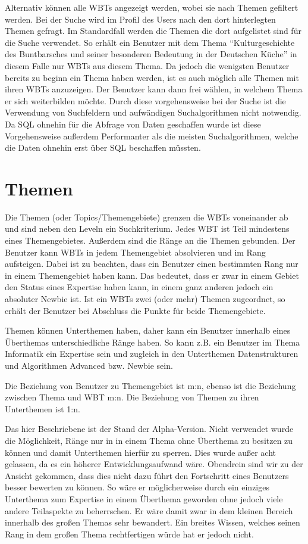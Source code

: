 Alternativ können alle WBTs angezeigt werden, wobei sie nach Themen gefiltert
werden. Bei der Suche wird im Profil des Users nach den dort hinterlegten Themen
gefragt. Im Standardfall werden die Themen die dort aufgelistet sind für die
Suche verwendet. So erhält ein Benutzer mit dem Thema "`Kulturgeschichte des
Buntbarsches und seiner besonderen Bedeutung in der Deutschen Küche"' in
diesem Falle nur WBTs aus diesem Thema. Da jedoch die wenigsten Benutzer bereits
zu beginn ein Thema haben werden, ist es auch möglich alle Themen mit ihren WBTs
anzuzeigen. Der Benutzer kann dann frei wählen, in welchem Thema er sich
weiterbilden möchte. Durch diese vorgehensweise bei der Suche ist die Verwendung
von Suchfeldern und aufwändigen Suchalgorithmen nicht notwendig. Da SQL ohnehin
für die Abfrage von Daten geschaffen wurde ist diese Vorgehensweise außerdem
Performanter als die meisten Suchalgorithmen, welche die Daten ohnehin erst über
SQL beschaffen müssten.

\section{Themen}
Die Themen (oder Topics/Themengebiete) grenzen die WBTs voneinander ab und sind
neben den Leveln ein Suchkriterium. Jedes WBT ist Teil mindestens eines
Themengebietes. Außerdem sind die Ränge an die Themen gebunden. Der Benutzer
kann WBTs in jedem Themengebiet absolvieren und im Rang aufsteigen. Dabei ist zu
beachten, dass ein Benutzer einen bestimmten Rang nur in einem Themengebiet
haben kann. Das bedeutet, dass er zwar in einem Gebiet den Status eines
Expertise haben kann, in einem ganz anderen jedoch ein absoluter Newbie ist. Ist
ein WBTs zwei (oder mehr) Themen zugeordnet, so erhält der Benutzer bei
Abschluss die Punkte für beide Themengebiete. 

Themen können Unterthemen haben, daher kann ein Benutzer innerhalb eines
Überthemas unterschiedliche Ränge haben. So kann z.B. ein Benutzer im Thema
Informatik ein Expertise sein und zugleich in den Unterthemen Datenstrukturen
und Algorithmen Advanced bzw. Newbie sein.

Die Beziehung von Benutzer zu Themengebiet ist m:n, ebenso ist die Beziehung
zwischen Thema und WBT m:n. Die Beziehung von Themen zu ihren Unterthemen ist
1:n. 

Das hier Beschriebene ist der Stand der Alpha-Version. Nicht verwendet wurde die
Möglichkeit, Ränge nur in in einem Thema ohne Überthema zu besitzen zu können
und damit Unterthemen hierfür zu sperren. Dies wurde außer acht gelassen, da es
ein höherer Entwicklungsaufwand wäre. Obendrein sind wir zu der Ansicht
gekommen, dass dies nicht dazu führt den Fortschritt eines Benutzers besser
bewerten zu können. So wäre er möglicherweise durch ein einziges Unterthema zum
Expertise in einem Überthema geworden ohne jedoch viele andere Teilaspekte zu
beherrschen. Er wäre damit zwar in dem kleinen Bereich innerhalb des großen
Themas sehr bewandert. Ein breites Wissen, welches seinen Rang in dem großen
Thema rechtfertigen würde hat er jedoch nicht.

